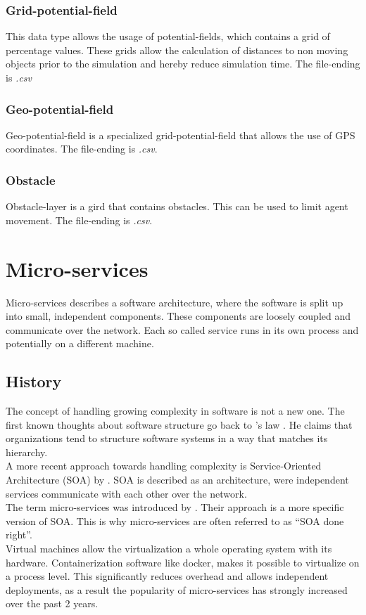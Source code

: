 \subsubsection{Grid-potential-field}
This data type allows the usage of potential-fields, which contains a grid of percentage values. These grids allow the calculation of distances to non moving objects prior to the simulation and hereby reduce simulation time. The file-ending is \textit{.csv}

\subsubsection{Geo-potential-field}
Geo-potential-field is a specialized grid-potential-field that allows the use of GPS coordinates. The file-ending is \textit{.csv}.

\subsubsection{Obstacle}
Obstacle-layer is a gird that contains obstacles. This can be used to limit agent movement. The file-ending is \textit{.csv}.



\section{Micro-services}
\label{sec:micro-services}
Micro-services describes a software architecture, where the software is split up into small, independent components. These components are loosely coupled and communicate over the network. Each so called service runs in its own process and potentially on a different machine.


\subsection{History}
The concept of handling growing complexity in software is not a new one. The first known thoughts about software structure go back to \citeauthor{conway1968committees}'s law \citeyearpar{conway1968committees}. He claims that organizations tend to structure software systems in a way that matches its hierarchy.\\
A more recent approach towards handling complexity is Service-Oriented Architecture (SOA) by \cite{as2005service}. SOA is described as an architecture, were independent services communicate with each other over the network.\\
The term micro-services was introduced by \cite{martinfowler2014microservices}. Their approach is a more specific version of SOA. This is why micro-services are often referred to as \enquote{SOA done right}.\\
Virtual machines allow the virtualization a whole operating system with its hardware. Containerization software like docker, makes it possible to virtualize on a process level. This significantly reduces overhead and allows independent deployments, as a result the popularity of micro-services has strongly increased over the past 2 years.


